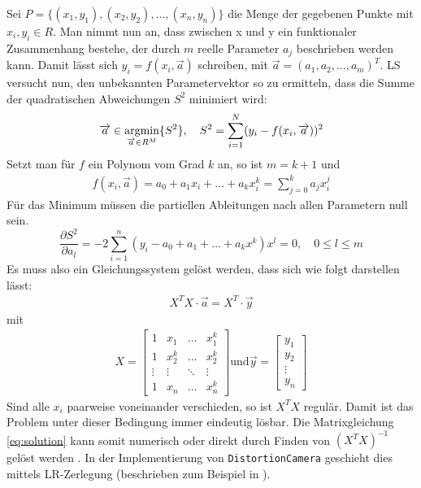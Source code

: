 Sei $P = \{(x_1, y_1), (x_2, y_2), ..., (x_n, y_n)\}$ die Menge der gegebenen Punkte mit $x_i, y_i \in R$. Man nimmt nun an, dass zwischen x und y ein funktionaler Zusammenhang bestehe, der durch $m$ reelle Parameter $a_j$ beschrieben werden kann. Damit lässt sich $y_i = f(x_i, \overrightarrow{a})$ schreiben, mit $\overrightarrow{a} = (a_1, a_2, \dots, a_m)^T $. LS versucht nun, den unbekannten Parametervektor so zu ermitteln, dass die Summe der quadratischen Abweichungen $S^2$ minimiert wird:
\begin{equation}
\begin{split}
\overrightarrow{a} \in \mathop{\mathrm{argmin}}_{\overrightarrow{a} \in R^M} \{ S^2 \}, \quad
S^2 =  \sum_{i=1}^{N} (y_i - f(x_i, \overrightarrow{a}))^2
\end{split}
\label{eq:opt}
\end{equation}
Setzt man für $f$ ein Polynom vom Grad $k$ an, so ist $m = k+1$ und
\begin{gather}
f(x_i, \overrightarrow{a}) = a_0 + a_1 x_i + \dots + a_k x_i^k = \sum_{j = 0}^{k} a_j x_i^j %
\end{gather}
Für das Minimum müssen die partiellen Ableitungen nach allen Parametern null sein.
\begin{equation}
\frac{\partial S^2}{\partial a_l} = -2 \sum_{i=1}^{n}(y_i - a_0 + a_1 + \dots + a_k x^k) x^l = 0, \quad 0 \leq l \leq m
\end{equation}
Es muss also ein Gleichungssystem gelöst werden, dass sich wie folgt darstellen lässt:
\begin{gather}
X^T X \cdot \overrightarrow{a} = X^T \cdot
\overrightarrow{y} \label{eq:solution}
\end{gather}
mit 
\begin{gather}
X =
\begin{bmatrix}
1 & x_1 & \dots & x_1^k \\
1 & x_2^k & \dots & x_2^k \\
\vdots & \vdots & \ddots & \vdots \\
1 & x_n & \dots & x_n^k
\end{bmatrix}
\text{und} \overrightarrow{y} = \begin{bmatrix}
y_1 \\ y_2 \\ \vdots \\ y_n
\end{bmatrix}
\end{gather}
Sind alle $x_i$ paarweise voneinander verschieden, so ist $X^T X$ regulär. Damit ist das Problem unter dieser Bedingung immer eindeutig lösbar. Die Matrixgleichung \ref{eq:solution} kann somit numerisch oder direkt durch Finden von $(X^T X)^{-1}$ gelöst werden \cite{lsq_poly_wolfram}. In der Implementierung von \texttt{DistortionCamera} geschieht dies mittels LR-Zerlegung (beschrieben zum Beispiel in \cite{bronstein}).

